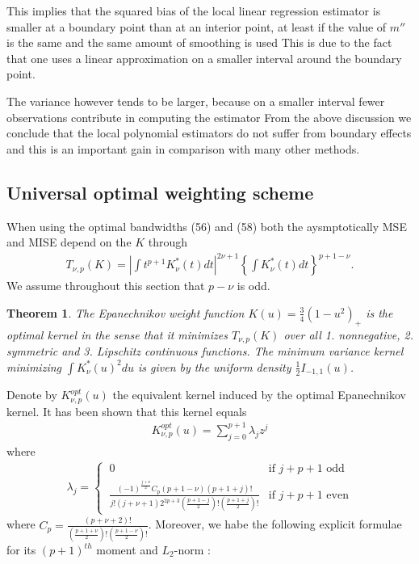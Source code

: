 \documentclass[12pt]{article}
\renewcommand{\=}[1]{\stackrel{#1}{=}} %
\newtheorem{thm}{Theorem}[section]
\theoremstyle{definition}
\begin{document}
	This implies that the squared bias of the local linear regression estimator is smaller at a boundary point than at an interior point, at least if the value of $m''$ is the same and the same amount of smoothing is used This is due to the fact that one uses a linear approximation on a smaller interval around the boundary point.
	
	The variance however tends to be larger, because on a smaller interval fewer observations contribute in computing the estimator From the above discussion we conclude that the local polynomial estimators do not suffer from boundary effects and this is an important gain in comparison with many other methods.

\subsection{Universal optimal weighting scheme}
	When using the optimal bandwidths (56) and (58) both the aysmptotically MSE and MISE depend on the $K$ through
	\begin{align}
	T_{\nu,p}(K)=\left|\int t^{p+1}K^*_{\nu}(t)dt\right|^{2\nu+1}\left\{\int K^*_{\nu}(t)dt\right\}^{p+1-\nu}.
	\end{align}
	We assume throughout this section that $p-\nu$ is odd.
	\begin{thm}
		The Epanechnikov weight function $K(u)=\frac{3}{4}(1-u^2)_+$ is the optimal kernel in the sense that it minimizes $T_{\nu,p}(K)$ over all 1. nonnegative, 2. symmetric and 3. Lipschitz continuous functions. The minimum variance kernel minimizing $\int K^*_{\nu}(u)^2du$ is given by the uniform density $\frac{1}{2}I_{-1,1}(u)$.
	\end{thm}
	Denote by $K_{\nu,p}^{opt}(u)$ the equivalent kernel induced by the optimal Epanechnikov kernel. It has been shown that this kernel equals
	\begin{align}
	K_{\nu,p}^{opt}(u)=\sum_{j=0}^{p+1}\lambda_jz^j
	\end{align}
	where
	\begin{align}
	\lambda_j=
	\begin{cases}
	~0&\text{if }j+p+1\text{ odd}\\
	~\frac{(-1)^{\frac{j+\nu}{2}}C_p(p+1-\nu)(p+1+j)!}{j!(j+\nu+1)2^{2p+3}\left(\frac{p+1-j}{2}\right)!\left(\frac{p+1+j}{2}\right)!}&\text{if }j+p+1\text{ even}
	\end{cases}
	\end{align}
	where $C_p=\frac{(p+\nu+2)!}{\left(\frac{p+1+\nu}{2}\right)!\left(\frac{p+1-\nu}{2}\right)!}$. Moreover, we habe the following explicit formulae for its $(p+1)^{th}$ moment and $L_2$-norm :
\end{document}
